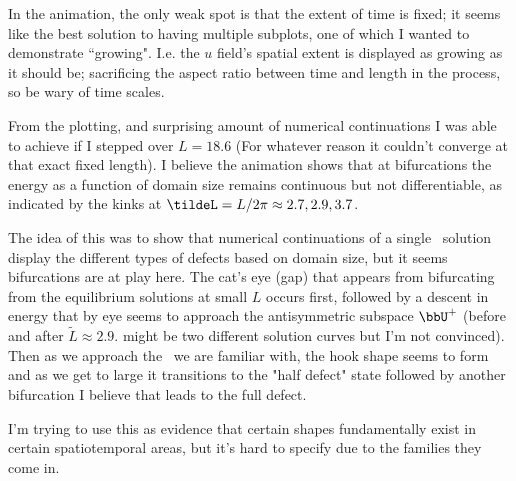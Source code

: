 \begin{description}
{In the animation, the only weak spot is that the extent of time is fixed;
it seems like the best solution to having multiple subplots, one of which
I wanted to demonstrate ``growing". I.e. the $u$ field's spatial extent is
displayed as growing as it should be; sacrificing the aspect ratio
between time and length in the process, so be wary of time scales.

From the plotting, and surprising amount of numerical continuations I was
able to achieve if I stepped over $L=18.6$ (For whatever reason it
couldn't converge at that exact fixed length). I believe the animation
shows that at bifurcations the energy as a function of domain size
remains continuous but not differentiable, as indicated by the kinks at
$\tildeL={L}/{2 \pi} \approx 2.7, 2.9,3.7$.

The idea of this was to show that numerical continuations of a single
\twot\ solution display the different types of defects based on domain
size, but it seems bifurcations are at play here. The cat's eye (gap)
that appears from bifurcating from the equilibrium solutions at small $L$
occurs first, followed by a descent in energy that by eye seems to
approach the antisymmetric subspace $\bbU^+$ (before and after
$\tilde{L}\approx 2.9$. might be two different solution curves but I'm
not convinced). Then as we approach the \ppo\ we are familiar with, the
hook shape seems to form and as we get to large it transitions to the
"half defect" state followed by another bifurcation I believe that leads
to the full defect.

I'm trying to use this as evidence that certain shapes fundamentally
exist in certain spatiotemporal areas, but it's hard to specify due to
the families they come in.
}

\end{description}
